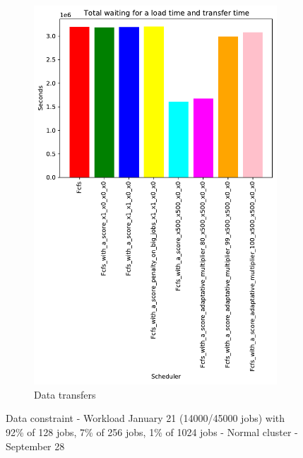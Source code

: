 \documentclass[a4paper]{article}
\begin{document}
\begin{figure}[H]
\begin{subfigure}[b]{0.4\linewidth}\centering\includegraphics[width=0.9\linewidth]{MBSS/plot/Results_FCFS_Score_Adaptative_Multiplier_2022-01-21->2022-01-21_V9271_Total_waiting_for_a_load_time_and_transfer_time_450_128_32_256_4_1024.pdf}\caption{Data transfers}\end{subfigure}
\caption{Data constraint - Workload January 21 (14000/45000 jobs) with 92\% of 128 jobs, 7\% of 256 jobs, 1\% of 1024 jobs - Normal cluster - September 28}\end{figure}
\end{document}
